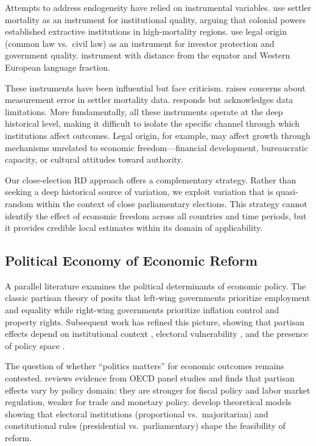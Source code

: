 \documentclass[12pt,a4paper]{article}
\begin{document}
Attempts to address endogeneity have relied on instrumental variables. 
\citet{acemoglu2001colonial} use settler mortality as an instrument for 
institutional quality, arguing that colonial powers established extractive 
institutions in high-mortality regions. \citet{laporta1999quality} use 
legal origin (common law vs.\ civil law) as an instrument for investor 
protection and government quality. \citet{hall1999why} instrument with 
distance from the equator and Western European language fraction.

These instruments have been influential but face criticism. \citet{albouy2012colonial} 
raises concerns about measurement error in settler mortality data. 
\citet{acemoglu2012colonial} responds but acknowledges data limitations. 
More fundamentally, all these instruments operate at the deep historical 
level, making it difficult to isolate the specific channel through which 
institutions affect outcomes. Legal origin, for example, may affect 
growth through mechanisms unrelated to economic freedom---financial 
development, bureaucratic capacity, or cultural attitudes toward authority.

Our close-election RD approach offers a complementary strategy. Rather 
than seeking a deep historical source of variation, we exploit variation 
that is quasi-random within the context of close parliamentary elections. 
This strategy cannot identify the effect of economic freedom across all 
countries and time periods, but it provides credible local estimates within 
its domain of applicability.

\subsection{Political Economy of Economic Reform}

A parallel literature examines the political determinants of economic 
policy. The classic partisan theory of \citet{hibbs1977political} posits 
that left-wing governments prioritize employment and equality while 
right-wing governments prioritize inflation control and property rights. 
Subsequent work has refined this picture, showing that partisan effects 
depend on institutional context \citep{garrett1998partisan}, electoral 
vulnerability \citep{mian2010political}, and the presence of policy space 
\citep{rodrik2000institutions}.

The question of whether ``politics matters'' for economic outcomes remains 
contested. \citet{potrafke2017partisan} reviews evidence from OECD panel 
studies and finds that partisan effects vary by policy domain: they are 
stronger for fiscal policy and labor market regulation, weaker for trade 
and monetary policy. \citet{persson2000political} develop theoretical 
models showing that electoral institutions (proportional vs.\ majoritarian) 
and constitutional rules (presidential vs.\ parliamentary) shape the 
feasibility of reform.
\end{document}
